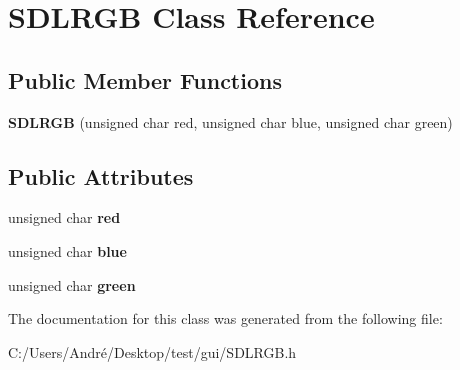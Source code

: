 \hypertarget{class_s_d_l_r_g_b}{}\section{S\+D\+L\+R\+G\+B Class Reference}
\label{class_s_d_l_r_g_b}
\subsection*{Public Member Functions}
\begin{DoxyCompactItemize}
\item 
\hypertarget{class_s_d_l_r_g_b_ab1c9e2530d04232a85fe11e0419adc40}{}{\bfseries S\+D\+L\+R\+G\+B} (unsigned char red, unsigned char blue, unsigned char green)\label{class_s_d_l_r_g_b_ab1c9e2530d04232a85fe11e0419adc40}

\end{DoxyCompactItemize}
\subsection*{Public Attributes}
\begin{DoxyCompactItemize}
\item 
\hypertarget{class_s_d_l_r_g_b_ae89fec7cd2e6b0f3ca07d82cb530878f}{}unsigned char {\bfseries red}\label{class_s_d_l_r_g_b_ae89fec7cd2e6b0f3ca07d82cb530878f}

\item 
\hypertarget{class_s_d_l_r_g_b_adea42fe779da29234102660d5b340990}{}unsigned char {\bfseries blue}\label{class_s_d_l_r_g_b_adea42fe779da29234102660d5b340990}

\item 
\hypertarget{class_s_d_l_r_g_b_a84a775d2f8e889d051258c421b318f9b}{}unsigned char {\bfseries green}\label{class_s_d_l_r_g_b_a84a775d2f8e889d051258c421b318f9b}

\end{DoxyCompactItemize}


The documentation for this class was generated from the following file\+:\begin{DoxyCompactItemize}
\item 
C\+:/\+Users/\+André/\+Desktop/test/gui/S\+D\+L\+R\+G\+B.\+h\end{DoxyCompactItemize}
